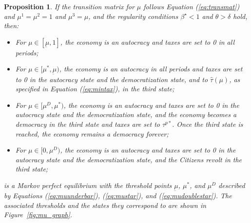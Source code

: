 \documentclass[12pt]{article}
\numberwithin{equation}{section}
\newtheorem{prop}{Proposition}
\begin{document}
\begin{prop}
If the transition matrix for $\mu$ follows Equation (\ref{eq:transmat}) and $\mu^{1}=\mu^{2}=1$ and $\mu^{3}=\mu$, and the regularity conditions $\beta^{\star}<1$ and $\theta>\delta$ hold, then: 
\begin{itemize}
	\item For $\mu \in [\underbar{\ensuremath{\mu}},1]$, the economy is an autocracy and taxes are set to 0 in all periods;
	\item For $\mu \in [\mu^{*},\underbar{\ensuremath{\mu}})$, the economy is an autocracy in all periods and taxes are set to 0 in the autocracy state and the democratization state, and to $\hat{\tau}(\mu)$, as specified in Equation (\ref{eq:mintax}), in the third state;
	\item For $\mu \in [\mu^{D},\mu^{*})$, the economy is an autocracy and taxes are set to 0 in the autocracy state and the democratization state, and the economy becomes a democracy in the third state and taxes are set to $\tau^{p*}$. Once the third state is reached, the economy remains a democracy forever;
	\item For $\mu \in [0,\mu^{D})$, the economy is an autocracy and taxes are set to 0 in the autocracy state and the democratization state, and the Citizens revolt in the third state;
\end{itemize}
is a Markov perfect equilibrium with the threshold points $\underbar{\ensuremath{\mu}}$, $\mu^{*}$, and $\mu^{D}$ described by Equations (\ref{eq:muunderbar}), (\ref{eq:mustar}), and (\ref{eq:mudoublestar}). The associated thresholds and the states they correspond to are shown in Figure~\ref{fig:mu_graph}.
\end{prop}
\end{document}
